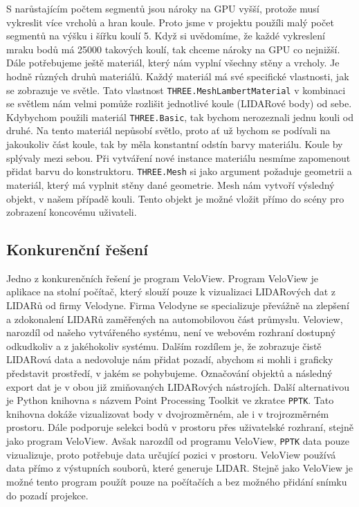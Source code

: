 \documentclass[czech,bachelor,dept420,male,cpdeclaration]{diploma}
\begin{document}
S narůstajícím počtem segmentů jsou nároky na GPU vyšší, protože musí vykreslit více vrcholů a hran koule. Proto jsme v projektu použíli malý počet segmentů na výšku i šířku koulí \num{5}. Když si uvědomíme, že každé vykreslení mraku bodů má \num{25000} takových koulí, tak chceme nároky na GPU co nejnižší.
Dále potřebujeme ještě materiál, který nám vyplní všechny stěny a vrcholy. Je hodně různých druhů materiálů. Každý materiál má své specifické vlastnosti, jak se zobrazuje ve světle. Tato vlastnost \texttt{THREE.MeshLambertMaterial} v kombinaci se světlem nám velmi pomůže rozlišit jednotlivé koule (LIDARové body) od sebe. Kdybychom použili materiál \texttt{THREE.Basic}, tak bychom nerozeznali jednu kouli od druhé. Na tento materiál nepůsobí světlo, proto ať už bychom se podívali na jakoukoliv část koule, tak by měla konstantní odstín barvy materiálu. Koule by splývaly mezi sebou. Při vytváření nové instance materiálu nesmíme zapomenout přidat barvu do konstruktoru. \texttt{THREE.Mesh} si jako argument požaduje geometrii a materiál, který má vyplnit stěny dané geometrie. Mesh nám vytvoří výsledný objekt, v našem případě kouli. Tento objekt je možné vložit přímo do scény pro zobrazení koncovému uživateli.

\subsection{Konkurenční řešení}
Jedno z konkurenčních řešení je program VeloView. Program VeloView je aplikace na stolní počítač, který slouží pouze k vizualizaci LIDARových dat z LIDARů od firmy Velodyne. Firma Velodyne se specializuje převážně na zlepšení a zdokonalení LIDARů zaměřených na automobilovou část průmyslu. Veloview, narozdíl od našeho vytvářeného systému, není ve webovém rozhraní dostupný odkudkoliv a z jakéhokoliv systému. Dalším rozdílem je, že zobrazuje čistě LIDARová data a nedovoluje nám přidat pozadí, abychom si mohli i graficky představit prostředí, v jakém se pohybujeme. Označování objektů a následný export dat je v obou již zmiňovaných LIDARových nástrojích.
Další alternativou je Python knihovna s názvem Point Processing Toolkit ve zkratce \texttt{PPTK}. Tato knihovna dokáže vizualizovat body v dvojrozměrném, ale i v trojrozměrném prostoru. Dále podporuje selekci bodů v prostoru přes uživatelské rozhraní, stejně jako program VeloView. Avšak narozdíl od programu VeloView, \texttt{PPTK} data pouze vizualizuje, proto potřebuje data určující pozici v prostoru. VeloView používá data přímo z výstupních souborů, které generuje LIDAR. Stejně jako VeloView je možné tento program použít pouze na počítačích a bez možného přidání snímku do pozadí projekce.
\end{document}

